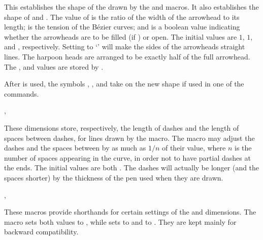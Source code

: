 \documentclass[letterpaper]{article}
\begin{document}
\begin{cd}
%
\end{cd}

This establishes the shape of the  drawn by the
 and  macros. It also establishes the shape of
 and . The value of  is
the ratio of the width of the arrowhead to its length;  is
the tension of the B\'ezier curves; and  is a \MF{} boolean
value indicating whether the arrowheads are to be filled (if )
or open. The initial values are $1$, $1$, and , respectively.
Setting  to `' will make the sides of the
arrowheads straight lines. The harpoon heads are arranged to be exactly
half of the full arrowhead. The ,  and
 values are stored by \MF{}.

After  is used, the symbols ,
, and  take on the new shape if used
in one of the  commands.

\begin{cd}
, %
\end{cd}

These dimensions store, respectively, the length of dashes and the
length of spaces between dashes, for lines drawn by the 
macro. The  macro may adjust the dashes and the spaces
between by as much as $1/n$ of their value, where $n$ is the number of
spaces appearing in the curve, in order not to have partial dashes at
the ends. The initial values are both \dim{4pt}. The dashes will
actually be longer (and the spaces shorter) by the thickness of the pen
used when they are drawn.

\begin{cd}
, %
%
\end{cd}

These macros provide shorthands for certain settings of the 
and  dimensions. The macro  sets both
values to \dim{4pt}, while  sets  to
\dim{1pt} and  to \dim{2pt}. They are kept mainly for
backward compatibility.
\end{document}
